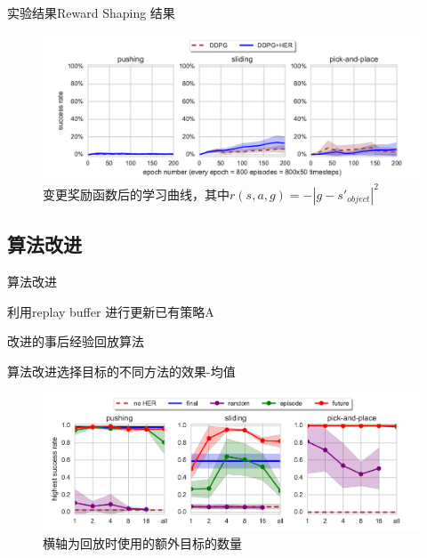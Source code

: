 \documentclass[10pt]{beamer}
\begin{document}
	\begin{frame}{实验结果}{Reward Shaping 结果}
		\begin{figure}
			\centering
			\includegraphics[width=0.9\linewidth]{pictures/reward-shape-expr}
			\caption{变更奖励函数后的学习曲线，其中$r(s,a,g) = -|g-s'_{object}|^2$}
			\label{fig:reward-shape-expr}
		\end{figure}
		
	\end{frame}

	\subsection{算法改进}

	\begin{frame}{算法改进}
		\begin{algorithm}[H]
			
			利用replay buffer 进行更新已有策略A\;
			\caption{改进的事后经验回放算法}\label{alg:adv-her}
		\end{algorithm}
	\end{frame}

	\begin{frame}{算法改进}{选择目标的不同方法的效果-均值}
		\begin{figure}
			\centering
			\includegraphics[width=0.9\linewidth]{pictures/her-with-additional-goals}
			\caption{横轴为回放时使用的额外目标的数量}
			\label{fig:her-with-additional-goals}
		\end{figure}
		
	\end{frame}
\end{document}
